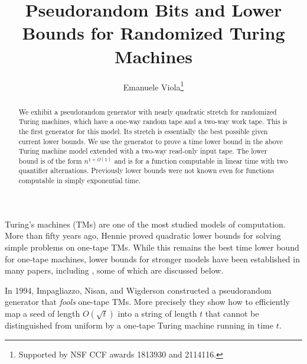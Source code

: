 \documentclass{toc}
\begin{document}
\begin{frontmatter}

\title{Pseudorandom Bits and Lower Bounds for Randomized Turing Machines}




\author[viola]{Emanuele Viola\thanks{Supported by NSF CCF awards 1813930 and 2114116.}}

\begin{abstract}
We exhibit a pseudorandom generator with nearly quadratic stretch
for randomized Turing machines, which have a one-way random tape and
a two-way work tape. This is the first generator for this model. Its
stretch is essentially the best possible given current
lower bounds.  %
We use the generator to prove a time lower bound in the above Turing
machine model extended with a two-way read-only input tape. The lower
bound is of the form $n^{1+\Omega(1)}$ and is for a function computable
in linear time with two quantifier alternations. 
Previously lower bounds were not known even for functions computable in
%
%
simply exponential time.  %
\end{abstract}




\end{frontmatter}

%
\section{}      %
Turing's machines (TMs) %
are one of the most studied models of computation.
More than fifty years ago, Hennie proved quadratic lower bounds \cite{DBLP:journals/iandc/Hennie65}
for solving simple problems on one-tape TMs. While this remains the
best time lower bound for one-tape machines, lower bounds for stronger
models have been established in many papers, %
 including \cite{PPST83,MR808746,MaS87,KalyanasundaramS92,DBLP:conf/coco/Santhanam01,DBLP:journals/tcs/MelkebeekR05,DBLP:journals/cc/Williams06},
some of which are discussed below.

In 1994, Impagliazzo, Nisan, and Wigderson constructed a pseudorandom
generator \cite{INW94} that \emph{fools }one-tape TMs. More precisely
they show how to efficiently map a seed of length $O(\sqrt{t})$ into
a string of length $t$ that cannot be distinguished from uniform
by a one-tape Turing machine running in time $t$.
\end{document}
